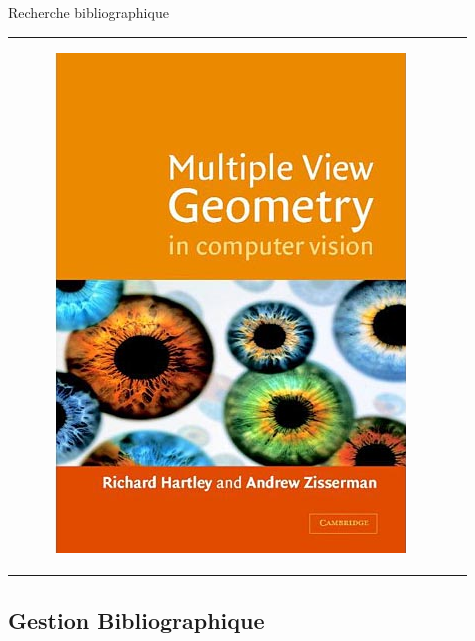 \documentclass{beamer}
\begin{document}
\begin{frame}{Recherche bibliographique}
\begin{tabular}{c c}
\begin{minipage}{0.4\linewidth}
\begin{figure}
  \vspace{3mm}
  \includegraphics[width=0.5\linewidth]{images/Book.png}
  \end{figure}
  \end{minipage}
  \end{tabular}
\end{frame}


\subsection*{Gestion Bibliographique}
\end{document}
